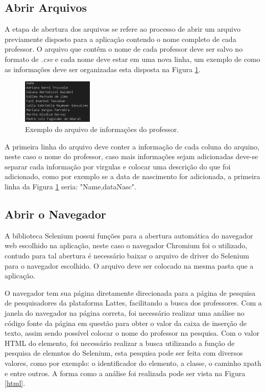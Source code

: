 \documentclass[conference]{IEEEtran}
\begin{document}
\subsection{Abrir Arquivos}
A etapa de abertura dos arquivos se refere ao processo de abrir um arquivo previamente disposto para a aplicação contendo o nome completo de cada professor. O arquivo que contêm o nome de cada professor deve ser salvo no formato de \textit{.csv} e cada nome deve estar em uma nova linha, um exemplo de como as informações deve ser organizadas esta disposta na Figura \ref{info}.

\begin{figure}[htbp]
\centerline{\includegraphics[width=0.3\textwidth]{info.png}}
\caption{Exemplo do arquivo de informações do professor.}
\label{info}
\end{figure}

A primeira linha do arquivo deve conter a informação de cada coluna do arquino, neste caso o nome do professor, caso mais informações sejam adicionadas deve-se separar cada informação por virgulas e colocar uma descrição do que foi adicionado, como por exemplo se a data de nascimento for adicionada, a primeira linha da Figura \ref{info} seria: "Name,dataNasc".

\subsection{Abrir o Navegador}

A biblioteca Selenium possui funções para a abertura automática do navegador web escolhido na aplicação, neste caso o navegador Chromium foi o utilizado, contudo para tal abertura é necessário baixar o arquivo de driver do Selenium para o navegador escolhido. O arquivo deve ser colocado na mesma pasta que a aplicação.

O navegador tem sua página diretamente direcionada para a página de pesquisa de pesquisadores da plataforma Lattes, facilitando a busca dos professores. Com a janela do navegador na página correta, foi necessário realizar uma análise no código fonte da página em questão para obter o valor da caixa de inserção de texto, assim sendo possível colocar o nome do professor na pesquisa. Com o valor HTML do elemento, foi necessário realizar a busca utilizando a função de pesquisa de elemntos do Selenium, esta pesquisa pode ser feita com diversos valores, como por exemplo: o identificador do elemento, a classe, o caminho xpath e entre outros. A forma como a análise foi realizada pode ser vista na Figura \ref{html}.
\end{document}
